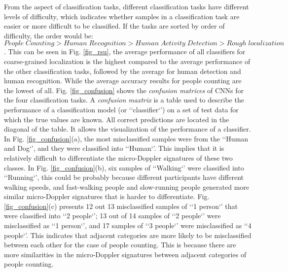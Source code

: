 From the aspect of classification tasks, different classification tasks have different levels of difficulty, which indicates whether samples in a classification task are easier or more difficult to be classified. If the tasks are sorted by order of difficulty, the order would be: $People\;  Counting> Human\;  Recognition>Human\;  Activity\;  Detection>Rough\;  localization$. This can be seen in Fig. \ref{fig_rsu}, the average performance of all classifiers for coarse-grained localization is the highest compared to the average performance of the other classification tasks, followed by the average for human detection and human recognition. While the average accuracy results for people counting are the lowest of all. Fig. \ref{fig_confusion} shows the \textit{confusion matrices} of CNNs for the four classification tasks. A \textit{confusion maxtrix} is a table used to describe the performance of a classification model (or `‘classifier`’) on a set of test data for which the true values are known. All correct predictions are located in the diagonal of the table. It allows the visualization of the performance of a classifier. In Fig. \ref{fig_confusion}(a), the most misclassified samples were from the `‘Human and Dog`’, and they were classified into `‘Human`’. This implies that it is relatively difficult to differentiate the micro-Doppler signatures of these two classes. In Fig. \ref{fig_confusion}(b), six samples of `‘Walking`’ were classified into `‘Running`’, this could be probably because different participants have different walking speeds, and fast-walking people and slow-running people generated more similar micro-Doppler signatures that is harder to differentiate. Fig. \ref{fig_confusion}(c) presents 12 out 13 misclassified samples of `‘1 person`’ that were classified into `‘2 people`’; 13 out of 14 samples of `‘2 people`’ were misclassified as  `‘1 person`’, and 17 samples of `‘3 people`’ were misclassified as `‘4 people`’. This indicates that adjacent categories are more likely to be misclassified between each other for the case of people counting. This is because there are more similarities in the micro-Doppler signatures between adjacent categories of people counting.


